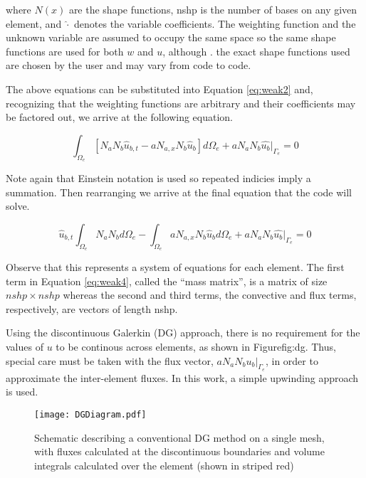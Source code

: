 \documentclass[11pt]{article}
\begin{document}
\noindent where $N(x)$ are the shape functions, nshp is the number of bases on 
any given element, and $\hat{\cdot}$ denotes the variable coefficients. 
The weighting function and the unknown variable are assumed to occupy the same space so the 
same shape functions are used for both $w$ and $u$, although . 
the exact shape functions used are chosen by the user and may vary from code to code.

The above equations can be substituted into Equation \eqref{eq:weak2} and, recognizing that the
weighting functions are arbitrary and their coefficients may be factored out, we arrive at the
following equation. 

\begin{equation}
\int_{\Omega_e} \left[ N_a N_b \hat{u}_{b,t} - a N_{a,x} N_b \hat{u}_b \right ]d{\Omega_e} + a N_a N_b \hat{u_b}|_{\Gamma_e}= 0
\label{eq:weak3}
\end{equation}

Note again that Einstein notation is used so repeated indicies imply a summation. Then
rearranging we arrive at the final equation that the code will solve. 
   
\begin{equation}
\hat{u}_{b,t} \int_{\Omega_e} N_a N_b d{\Omega_e} - \int_{\Omega_e} a N_{a,x} N_b \hat{u}_b d{\Omega_e} + a N_a N_b \hat{u_b}|_{\Gamma_e}= 0
\label{eq:weak4}
\end{equation}

Observe that this represents a system of equations for each element. 
The first term in Equation \eqref{eq:weak4}, called the ``mass matrix'',
is a matrix of size $nshp \times nshp$ whereas the second and third terms, the convective and 
flux terms, respectively, are vectors of length nshp.
 
Using the discontinuous Galerkin (DG) approach, there is no requirement for
the values of $u$ to be continous across elements, as shown in Figure{fig:dg}. 
Thus, special care must be taken with the flux vector, $a N_a N_b u_b |_{\Gamma_e}$,
in order to approximate the inter-element fluxes. In this work, a simple
upwinding approach is used. 

\begin{figure}[h]
\centering
  \texttt{[image: DGDiagram.pdf]}
  \caption{Schematic describing a conventional DG method on a single mesh, with fluxes calculated at the discontinuous boundaries and volume integrals calculated over the element (shown in striped red)}
  \label{fig:dg}
\end{figure}
\end{document}
